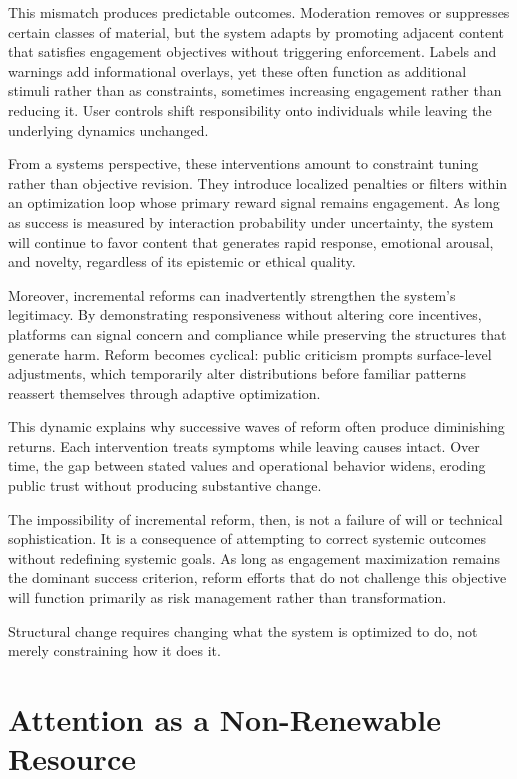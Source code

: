\documentclass[12pt]{article}
\begin{document}
This mismatch produces predictable outcomes. Moderation removes or suppresses certain classes of material, but the system adapts by promoting adjacent content that satisfies engagement objectives without triggering enforcement. Labels and warnings add informational overlays, yet these often function as additional stimuli rather than as constraints, sometimes increasing engagement rather than reducing it. User controls shift responsibility onto individuals while leaving the underlying dynamics unchanged.

From a systems perspective, these interventions amount to constraint tuning rather than objective revision. They introduce localized penalties or filters within an optimization loop whose primary reward signal remains engagement. As long as success is measured by interaction probability under uncertainty, the system will continue to favor content that generates rapid response, emotional arousal, and novelty, regardless of its epistemic or ethical quality.

Moreover, incremental reforms can inadvertently strengthen the system’s legitimacy. By demonstrating responsiveness without altering core incentives, platforms can signal concern and compliance while preserving the structures that generate harm. Reform becomes cyclical: public criticism prompts surface-level adjustments, which temporarily alter distributions before familiar patterns reassert themselves through adaptive optimization.

This dynamic explains why successive waves of reform often produce diminishing returns. Each intervention treats symptoms while leaving causes intact. Over time, the gap between stated values and operational behavior widens, eroding public trust without producing substantive change.

The impossibility of incremental reform, then, is not a failure of will or technical sophistication. It is a consequence of attempting to correct systemic outcomes without redefining systemic goals. As long as engagement maximization remains the dominant success criterion, reform efforts that do not challenge this objective will function primarily as risk management rather than transformation.

Structural change requires changing what the system is optimized to do, not merely constraining how it does it.

\section{Attention as a Non-Renewable Resource}
\end{document}
